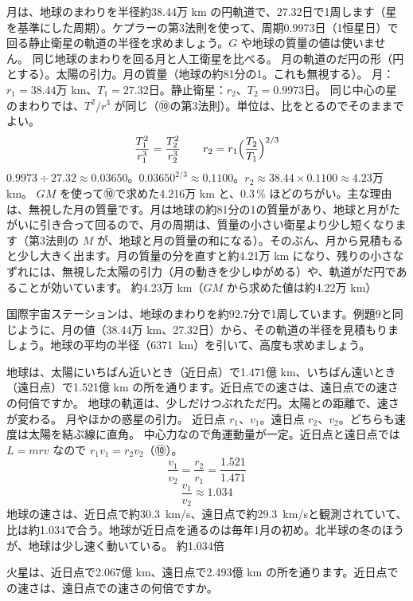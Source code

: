 \begin{phreidai}
\label{ph:力-6:ex9}月は、地球のまわりを半径約38.44万 km の円軌道で、27.32日で1周します（星を基準にした周期）。ケプラーの第3法則を使って、周期0.9973日（1恒星日）で回る静止衛星の軌道の半径を求めましょう。$G$ や地球の質量の値は使いません。
\phbamen
同じ地球のまわりを回る月と人工衛星を比べる。
\phmushi
月の軌道のだ円の形（円とする）。太陽の引力。月の質量（地球の約81分の1。これも無視する）。
\phzu
月：$r_1=38.44$万 km、$T_1=27.32$日。静止衛星：$r_2$、$T_2=0.9973$日。
\phriyu
同じ中心の星のまわりでは、$T^2/r^3$ が同じ（⑩の第3法則）。単位は、比をとるのでそのままでよい。
\phtateru
\[ \frac{T_1^2}{r_1^3}=\frac{T_2^2}{r_2^3}\qquad r_2=r_1\Bigl(\frac{T_2}{T_1}\Bigr)^{2/3} \]
\phtoku
$0.9973\div27.32\approx0.03650$。$0.03650^{2/3}\approx0.1100$。$r_2\approx38.44\times0.1100\approx4.23$万 km。
\phtashikame
$GM$ を使って⑩で求めた4.216万 km と、0.3\,\% ほどのちがい。主な理由は、無視した月の質量です。月は地球の約81分の1の質量があり、地球と月がたがいに引き合って回るので、月の周期は、質量の小さい衛星より少し短くなります（第3法則の $M$ が、地球と月の質量の和になる）。そのぶん、月から見積もると少し大きく出ます。月の質量の分を直すと約4.21万 km になり、残りの小さなずれには、無視した太陽の引力（月の動きを少しゆがめる）や、軌道がだ円であることが効いています。
\kotae 約4.23万 km（$GM$ から求めた値は約4.22万 km）
\end{phreidai}
\begin{jibun}
国際宇宙ステーションは、地球のまわりを約92.7分で1周しています。例題9と同じように、月の値（38.44万 km、27.32日）から、その軌道の半径を見積もりましょう。地球の平均の半径（\qty{6371}{km}）を引いて、高度も求めましょう。
\end{jibun}

\begin{phreidai}
\label{ph:力-6:ex10}地球は、太陽にいちばん近いとき（近日点）で1.471億 km、いちばん遠いとき（遠日点）で1.521億 km の所を通ります。近日点での速さは、遠日点での速さの何倍ですか。
\phbamen
地球の軌道は、少しだけつぶれただ円。太陽との距離で、速さが変わる。
\phmushi
月やほかの惑星の引力。
\phzu
近日点 $r_1$、$v_1$。遠日点 $r_2$、$v_2$。どちらも速度は太陽を結ぶ線に直角。
\phriyu
中心力なので角運動量が一定。近日点と遠日点では $L=mrv$ なので $r_1v_1=r_2v_2$（⑩）。
\phtateru
\[ \frac{v_1}{v_2}=\frac{r_2}{r_1}=\frac{1.521}{1.471} \]
\phtoku
\[ \frac{v_1}{v_2}\approx1.034 \]
\phtashikame
地球の速さは、近日点で約\qty{30.3}{km/s}、遠日点で約\qty{29.3}{km/s}と観測されていて、比は約1.034で合う。\quad 地球が近日点を通るのは毎年1月の初め。北半球の冬のほうが、地球は少し速く動いている。
\kotae 約1.034倍
\end{phreidai}
\begin{jibun}
火星は、近日点で2.067億 km、遠日点で2.493億 km の所を通ります。近日点での速さは、遠日点での速さの何倍ですか。
\end{jibun}

